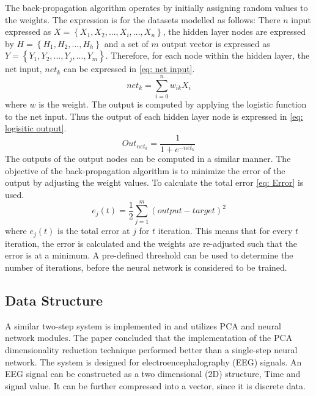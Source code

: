 \documentclass[11pt]{article}
\begin{document}
	The back-propagation algorithm operates by initially assigning random values to the weights. The expression is for the datasets modelled as follows: 
	\newline
	There $n$ input expressed as
	\newline
	$X = \left\{X_1, X_2, ... , X_i, ..., X_n\right\}$, the hidden layer nodes are expressed by $H = \left\{H_1, H_2, ... , H_h\right\}$ and a set of $m$ output vector is expressed as $Y = \left\{Y_1, Y_2, ... , Y_j, ... , Y_m\right\}$. Therefore, for each node within the hidden layer, the net input, $net_{k}$ can be expressed in \eqref{eq: net input}.
	\begin{equation}
		\label{eq: net input}
		net_{k} = \sum_{i = 0}^{n} w_{ik} X_i
	\end{equation}
	where $w$ is the weight.
	\newline
	The output is computed by applying the logistic function to the net input. Thus the output of each hidden layer node is expressed in \eqref{eq: logisitic output}.
	\begin{equation}
		\label{eq: logisitic output}
		Out_{net_k} = \frac{1}{1 + e^{-net_k}}
	\end{equation}
	The outputs of the output nodes can be computed in a similar manner. The objective of the back-propagation algorithm is to minimize the error of the output by adjusting the weight values. To calculate the total error \eqref{eq: Error} is used.
	\begin{equation}
		\label{eq: Error}
		e_j(t) = \frac{1}{2} \sum_{j = 1}^{m} (output - target)^2
	\end{equation}
	where $e_j(t)$ is the total error at $j$ for $t$ iteration. 
	\newline
	This means that for every $t$ iteration, the error is calculated and the weights are re-adjusted such that the error is at a minimum. A pre-defined threshold can be used to determine the number of iterations, before the neural network is considered to be trained.
	
	\subsection{Data Structure}
	A similar two-step system is implemented in \cite{kottaimalai_eeg_2013} and utilizes PCA and neural network modules. The paper concluded that the implementation of the PCA dimensionality reduction technique performed better than a single-step neural network. The system is designed for electroencephalography (EEG) signals. An EEG signal can be constructed as a two dimensional (2D) structure, Time and signal value. It can be further compressed into a vector, since it is discrete data. 
	
\end{document}

